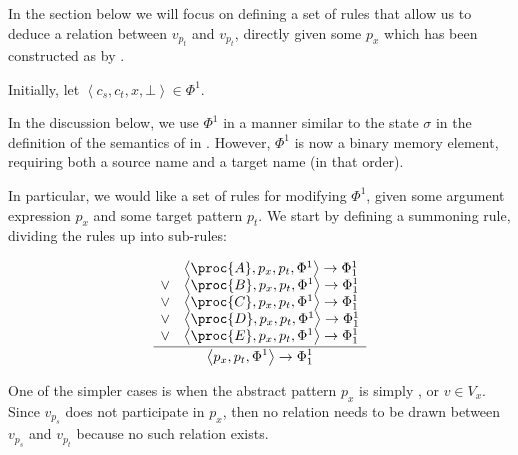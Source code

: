 
In the section below we will focus on defining a set of rules that allow us to
deduce a relation between $v_{p_t}$ and $v_{p_t}$, directly given some $p_x$
which has been constructed as by .

\begin{definition} Initially, let $\left\langle c_s,c_t,x, \bot\right\rangle
\in \Phi^1$.\end{definition}

In the discussion below, we use $\Phi^1$ in a manner similar to the state
$\sigma$ in the definition of the semantics of \D{} in .
However, $\Phi^1$ is now a binary memory element, requiring both a source name
and a target name (in that order).

In particular, we would like a set of rules for modifying $\Phi^1$, given some
argument expression $p_x$ and some target pattern $p_t$. We start by defining a
summoning rule, dividing the rules up into sub-rules:

\begin{equation}
{\displaystyle
\begin{array}{ll}
&   \left\langle\proc{A},p_x,p_t,\Phi^1\right\rangle
    \rightarrow
    \Phi^1_1\\
  \vee&
    \left\langle\proc{B},p_x,p_t,\Phi^1\right\rangle
    \rightarrow
    \Phi^1_1\\
  \vee&
    \left\langle\proc{C},p_x,p_t,\Phi^1\right\rangle
    \rightarrow
    \Phi^1_1\\
  \vee&
    \left\langle\proc{D},p_x,p_t,\Phi^1\right\rangle
    \rightarrow
    \Phi^1_1\\
  \vee&
    \left\langle\proc{E},p_x,p_t,\Phi^1\right\rangle
    \rightarrow
    \Phi^1_1
\end{array}
\over\displaystyle
  \left\langle p_x,p_t,\Phi^1\right\rangle
  \rightarrow
  \Phi^1_1
}
\end{equation}

One of the simpler cases is when the abstract pattern $p_x$ is simply ,
or $v\in V_x$. Since $v_{p_s}$ does not participate in $p_x$, then no relation
needs to be drawn between $v_{p_s}$ and $v_{p_t}$ because no such relation
exists.

